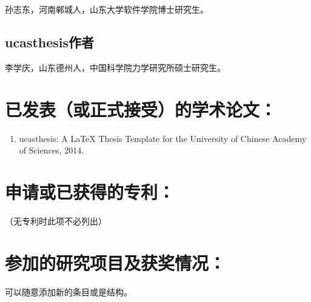 孙志东，河南郸城人，山东大学软件学院博士研究生。

\subsection*{ucasthesis作者}

李学庆，山东德州人，中国科学院力学研究所硕士研究生。

\section*{已发表（或正式接受）的学术论文：}

{
\setlist[enumerate]{}%
\begin{enumerate}[nosep]
    \item ucasthesis: A LaTeX Thesis Template for the University of Chinese Academy of Sciences, 2014.
\end{enumerate}
}

\section*{申请或已获得的专利：}

（无专利时此项不必列出）

\section*{参加的研究项目及获奖情况：}

可以随意添加新的条目或是结构。

\cleardoublepage[plain]%
